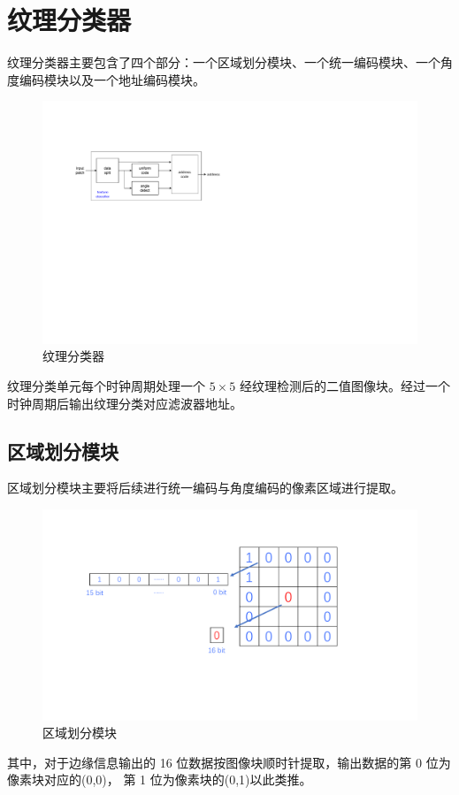 \documentclass[12pt, a4paper, oneside]{ctexbook}
\begin{document}
	\section{纹理分类器}
	纹理分类器主要包含了四个部分：一个区域划分模块、一个统一编码模块、一个角度编码模块以及一个地址编码模块。
		\begin{figure}[h]	
		\centering
		\includegraphics[scale=1.0]{pic/texture_classifier.pdf}
		\caption{纹理分类器}
		\end{figure}
	纹理分类单元每个时钟周期处理一个 $5\times5$ 经纹理检测后的二值图像块。经过一个时钟周期后输出纹理分类对应滤波器地址。
	\subsection{区域划分模块}
	区域划分模块主要将后续进行统一编码与角度编码的像素区域进行提取。
		\begin{figure}[h]	
		\centering
		\includegraphics[scale=0.5]{pic/patch.pdf}
		\caption{区域划分模块}
		\end{figure}			
	\par 其中，对于边缘信息输出的 16 位数据按图像块顺时针提取，输出数据的第 0 位为像素块对应的(0,0)，
	第 1 位为像素块的(0,1)以此类推。
\end{document}
